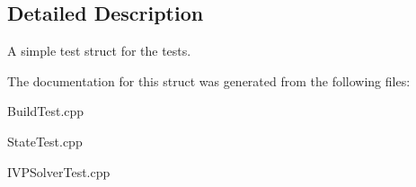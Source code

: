 \subsection{Detailed Description}
A simple test struct for the tests. 

The documentation for this struct was generated from the following files\+:\begin{DoxyCompactItemize}
\item 
Build\+Test.\+cpp\item 
State\+Test.\+cpp\item 
I\+V\+P\+Solver\+Test.\+cpp\end{DoxyCompactItemize}
